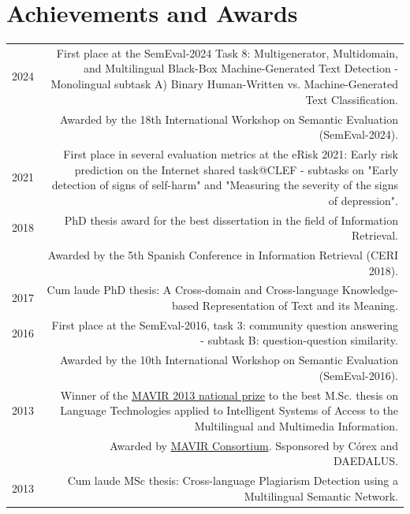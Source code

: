 \documentclass[10pt]{article}
\begin{document}
\section*{Achievements and Awards}
\begin{tabular}{L!{\VRule}R}
	2024 & First place at the SemEval-2024 Task 8: Multigenerator, Multidomain, and Multilingual Black-Box Machine-Generated Text Detection - Monolingual subtask A) Binary Human-Written vs. Machine-Generated Text Classification.\\\
    &\scriptsize{Awarded by the 18th International Workshop on Semantic Evaluation (SemEval-2024).}\vspace{5pt}\\
	2021 & First place in several evaluation metrics at the eRisk 2021: Early risk prediction on the Internet shared task@CLEF - subtasks on "Early detection of signs of self-harm" and "Measuring the severity of the signs of depression".\vspace{5pt}\\
	2018 & PhD thesis award for the best dissertation in the field of Information Retrieval.\\
	&\scriptsize{Awarded by the 5th Spanish Conference in Information Retrieval (CERI 2018).}\vspace{5pt}\\
	2017 & Cum laude PhD thesis: A Cross-domain and Cross-language Knowledge-based Representation of Text and its Meaning.\vspace{5pt}\\
	2016 & First place at the SemEval-2016, task 3: community question answering - subtask B: question-question similarity.\\
     &\scriptsize{Awarded by the 10th International Workshop on Semantic Evaluation (SemEval-2016).}\vspace{5pt}\\
	2013 & Winner of the \href{http://www.mavir.net/premio/182-resuelto-premio-mavir-2013}{MAVIR 2013 national prize} to the best M.Sc. thesis on Language Technologies applied to Intelligent Systems of Access
	to the Multilingual and Multimedia Information.\\
	&\scriptsize{Awarded by \href{http://www.mavir.net/}{MAVIR Consortium}. Ssponsored by C{\'o}rex and DAEDALUS.}\vspace{5pt}\\
 	2013 & Cum laude MSc thesis: Cross-language Plagiarism Detection using a Multilingual Se\-man\-tic Network.\vspace{5pt}\\
     \end{tabular}
     
\end{document}
